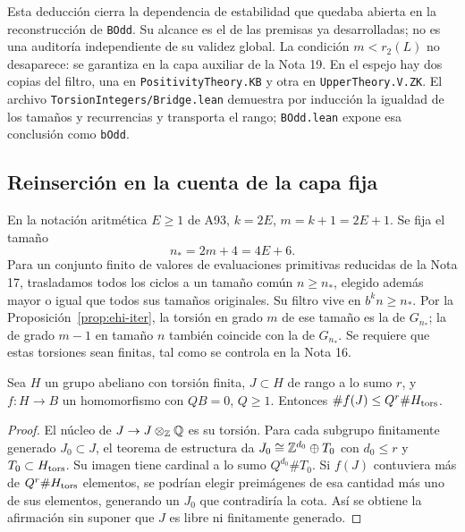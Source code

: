 Esta deducción cierra la dependencia de estabilidad que quedaba abierta en la reconstrucción de \texttt{BOdd}. Su alcance es el de las premisas ya desarrolladas; no es una auditoría independiente de su validez global. La condición $m<r_2(L)$ no desaparece: se garantiza en la capa auxiliar de la Nota 19. En el espejo hay dos copias del filtro, una en \texttt{PositivityTheory.KB} y otra en \texttt{UpperTheory.V.ZK}. El archivo \texttt{TorsionIntegers/Bridge.lean} demuestra por inducción la igualdad de los tamaños y recurrencias y transporta el rango; \texttt{BOdd.lean} expone esa conclusión como \texttt{bOdd}.

\subsection{Reinserción en la cuenta de la capa fija}

En la notación aritmética $E\ge1$ de A93, $k=2E$, $m=k+1=2E+1$. Se fija el tamaño
\begin{equation}
 n_*=2m+4=4E+6.
 \label{eq:ehi-nstar}
\end{equation}
Para un conjunto finito de valores de evaluaciones primitivas reducidas de la Nota 17, trasladamos todos los ciclos a un tamaño común $n\ge n_*$, elegido además mayor o igual que todos sus tamaños originales. Su filtro vive en $b^kn\ge n_*$. Por la Proposición~\ref{prop:ehi-iter}, la torsión en grado $m$ de ese tamaño es la de $G_{n_*}$; la de grado $m-1$ en tamaño $n$ también coincide con la de $G_{n_*}$. Se requiere que estas torsiones sean finitas, tal como se controla en la Nota 16.

\begin{lema}
\label{lem:ehi-count}
Sea $H$ un grupo abeliano con torsión finita, $J\subset H$ de rango a lo sumo $r$, y $f:H\to B$ un homomorfismo con $QB=0$, $Q\ge1$. Entonces $\# f(J)\le Q^r\#H_{\rm tors}$.
\end{lema}
\begin{proof}
El núcleo de $J\to J\otimes_{\mathbb{Z}}\mathbb{Q}$ es su torsión. Para cada subgrupo finitamente generado $J_0\subset J$, el teorema de estructura da $J_0\cong\mathbb{Z}^{d_0}\oplus T_0$ con $d_0\le r$ y $T_0\subset H_{\rm tors}$. Su imagen tiene cardinal a lo sumo $Q^{d_0}\#T_0$. Si $f(J)$ contuviera más de $Q^r\#H_{\rm tors}$ elementos, se podrían elegir preimágenes de esa cantidad más uno de sus elementos, generando un $J_0$ que contradiría la cota. Así se obtiene la afirmación sin suponer que $J$ es libre ni finitamente generado.
\end{proof}

